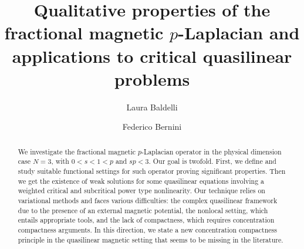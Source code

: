 \documentclass[leqno,11pt]{amsart}
\numberwithin{equation}{section}
\begin{document}
\title[Fractional magnetic $p$-Laplacian and applications]{Qualitative properties of the fractional magnetic $p$-Laplacian and applications to critical quasilinear problems}

\author[L. Baldelli]{Laura Baldelli}
    \address[L. Baldelli]{\newline\indent
	Institute for Analysis
	\newline\indent
	Karlsruhe Institute of Technology (KIT)
	\newline\indent
	Englerstraße 2
	\newline\indent
	D-76128 Karlsruhe, Germany}

\author[F. Bernini]{Federico Bernini}
    \address[F. Bernini]{\newline\indent
	Dipartimento di Matematica e Applicazioni
	\newline\indent
	Università degli Studi di Milano-Bicocca
	\newline\indent
	Via R. Cozzi, 55
	\newline\indent
	I-20125 Milan, Italy.}



\begin{abstract}
We investigate the fractional magnetic $p$-Laplacian operator in the physical dimension case $N=3$, with $0<s<1<p$ and $sp<3$. Our goal is twofold. First, we define and study suitable functional settings for such operator proving significant properties. Then we get the existence of weak solutions for some quasilinear equations involving a weighted critical and subcritical power type nonlinearity. Our technique relies on variational methods and faces various difficulties: the complex quasilinear framework due to the presence of an external magnetic potential, the nonlocal setting, which entails appropriate tools, and the lack of compactness, which requires concentration compactness arguments. In this direction, we state a new concentration compactness principle in the quasilinear magnetic setting that seems to be missing in the literature.
\end{abstract}

\maketitle
\end{document}
